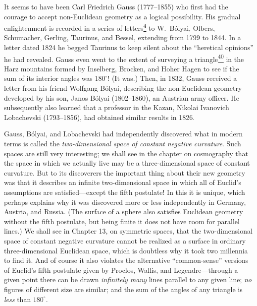 It seems to have been Carl Friedrich Gauss (1777--1855) who first had the
courage to accept non-Euclidean geometry as a logical possibility. His gradual
enlightenment is recorded in a series of
letters\hyperref[ch1-ref-4]{\textsuperscript{4}} to W.\ B\'olyai, Olbers,
Schumacher, Gerling, Taurinus, and Bessel, extending from 1799 to 1844. In a
letter dated 1824 he begged Taurinus to keep silent about the ``heretical
opinions'' he had revealed. Gauss even went to the extent of surveying a
triangle\hyperref[ch1-ref-40]{\textsuperscript{40}} in the Harz mountains
formed by Inselberg, Brocken, and Hoher Hagen to see if the sum of its interior
angles was \(180^\circ\)! (It was.) Then, in 1832, Gauss received a letter from
his friend Wolfgang B\'olyai, describing the non-Euclidean geometry developed
by his son, Janos B\'olyai (1802--1860), an Austrian army officer. He
subsequently also learned that a professor in the Kazan, Nikolai Ivanovich
Lobachevski (1793--1856), had obtained similar results in 1826.

Gauss, B\'olyai, and Lobachevski had independently discovered what in modern
terms is called the \emph{two-dimensional space of constant negative
curvature}. Such spaces are still very interesting; we shall see in the chapter
on cosmography that the space in which we actually live may be a
three-dimensional space of constant curvature. But to its discoverers the
important thing about their new geometry was that it describes an infinite
two-dimensional space in which all of Euclid's assumptions are
satisfied---except the fifth postulate! In this it is unique, which perhaps
explains why it was discovered more or less independently in Germany, Austria,
and Russia. (The surface of a sphere also satisfies Euclidean geometry without
the fifth postulate, but being finite it does not have room for parallel
lines.) We shall see in Chapter 13, on symmetric spaces, that the
two-dimensional space of constant negative curvature cannot be realized as a
surface in ordinary three-dimensional Euclidean space, which is doubtless why
it took two millennia to find it. And of course it also violates the
alternative ``common-sense'' versions of Euclid's fifth postulate given by
Proclos, Wallis, and Legendre---through a given point there can be drawn
\emph{infinitely many} lines parallel to any given line; \emph{no} figures of
different size are similar; and the sum of the angles of any triangle is
\emph{less} than \(180^\circ\).

